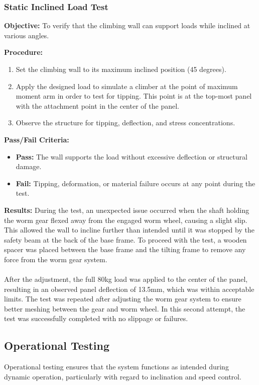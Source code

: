 \subsubsection{Static Inclined Load Test}
\label{sec:incline-load-test}
\textbf{Objective:} To verify that the climbing wall can support loads while inclined at various angles.

\textbf{Procedure:}
\begin{enumerate}
    \item Set the climbing wall to its maximum inclined position (45 degrees).
    \item Apply the designed load to simulate a climber at the point of maximum moment arm in order to test for tipping. This point is at the top-most panel with the attachment point in the center of the panel.
    \item Observe the structure for tipping, deflection, and stress concentrations.
\end{enumerate}

\textbf{Pass/Fail Criteria:}
\begin{itemize}
    \item \textbf{Pass:} The wall supports the load without excessive deflection or structural damage.
    \item \textbf{Fail:} Tipping, deformation, or material failure occurs at any point during the test.
\end{itemize}
\noindent
\textbf{Results:}
During the test, an unexpected issue occurred when the shaft holding the worm gear flexed away from the engaged worm wheel, causing a slight slip. This allowed the wall to incline further than intended until it was stopped by the safety beam at the back of the base frame. To proceed with the test, a wooden spacer was placed between the base frame and the tilting frame to remove any force from the worm gear system.\\\\
After the adjustment, the full 80kg load was applied to the center of the panel, resulting in an observed panel deflection of 13.5mm, which was within acceptable limits. The test was repeated after adjusting the worm gear system to ensure better meshing between the gear and worm wheel. In this second attempt, the test was successfully completed with no slippage or failures.


\subsection{Operational Testing}
Operational testing ensures that the system functions as intended during dynamic operation, particularly with regard to inclination and speed control.

